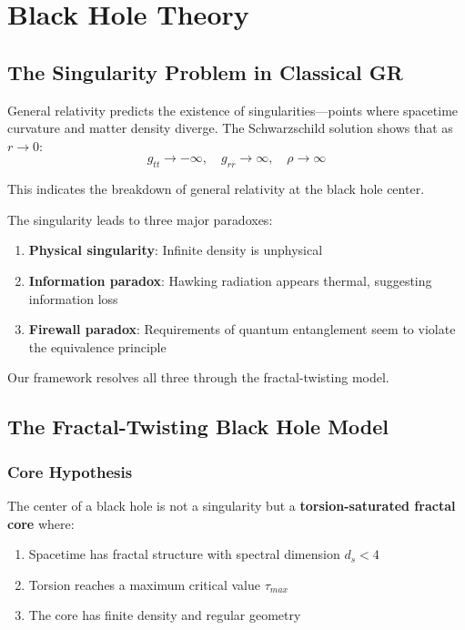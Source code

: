 \section{Black Hole Theory}
\label{sec:bh}

\subsection{The Singularity Problem in Classical GR}

General relativity predicts the existence of singularities—points where spacetime curvature and matter density diverge. The Schwarzschild solution shows that as $r \to 0$:
\begin{equation}
    g_{tt} \to -\infty, \quad g_{rr} \to \infty, \quad \rho \to \infty
\end{equation}

This indicates the breakdown of general relativity at the black hole center.

The singularity leads to three major paradoxes:
\begin{enumerate}
    \item \textbf{Physical singularity}: Infinite density is unphysical
    \item \textbf{Information paradox}: Hawking radiation appears thermal, suggesting information loss
    \item \textbf{Firewall paradox}: Requirements of quantum entanglement seem to violate the equivalence principle
\end{enumerate}

Our framework resolves all three through the fractal-twisting model.

\subsection{The Fractal-Twisting Black Hole Model}

\subsubsection{Core Hypothesis}

\begin{hypothesis}
The center of a black hole is not a singularity but a \textbf{torsion-saturated fractal core} where:
\begin{enumerate}
    \item Spacetime has fractal structure with spectral dimension $d_s < 4$
    \item Torsion reaches a maximum critical value $\tau_{max}$
    \item The core has finite density and regular geometry
\end{enumerate}
\end{hypothesis}

